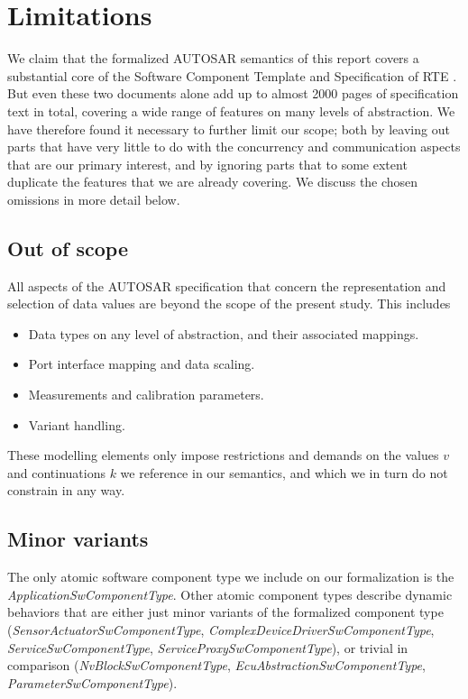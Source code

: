 \documentclass[twocolumn]{article}
\begin{document}
\section{Limitations}

We claim that the formalized AUTOSAR semantics of this report covers a substantial core of the Software Component Template and Specification of RTE \cite{AR:SWC, AR:RTE}. But even these two documents alone add up to almost 2000 pages of specification text in total, covering a wide range of features on many levels of abstraction. We have therefore found it necessary to further limit our scope; both by leaving out parts that have very little to do with the concurrency and communication aspects that are our primary interest, and by ignoring parts that to some extent duplicate the features that we are already covering. We discuss the chosen omissions in more detail below.

\subsection{Out of scope}

All aspects of the AUTOSAR specification that concern the representation and selection of data values are beyond the scope of the present study. This includes
\begin{itemize}
\item Data types on any level of abstraction, and their associated mappings.
\item Port interface mapping and data scaling.
\item Measurements and calibration parameters.
\item Variant handling.
\end{itemize}
These modelling elements only impose restrictions and demands on the values $v$ and continuations $k$ we reference in our semantics, and which we in turn do not constrain in any way.


\subsection{Minor variants}

The only atomic software component type we include on our formalization is the \emph{ApplicationSwComponentType}. Other atomic component types describe dynamic behaviors that are either just minor variants of the formalized component type (\emph{SensorActuatorSwComponentType}, \emph{ComplexDeviceDriverSwComponentType}, \emph{ServiceSwComponentType}, \emph{ServiceProxySwComponentType}), or trivial in comparison (\emph{NvBlockSwComponentType}, \emph{EcuAbstractionSwComponentType}, \emph{ParameterSwComponentType}).
\end{document}
